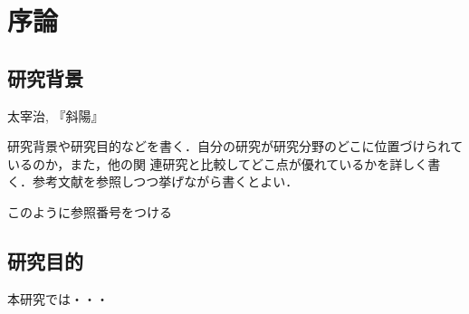 \documentclass{jsarticle}
\begin{document}
    
\chapter{序論}

\section{研究背景}


\begin{thebibliography}{9}
太宰治, 『斜陽』
\end{thebibliography}

研究背景や研究目的などを書く．自分の研究が研究分野のどこに位置づけられているのか，また，他の関
連研究と比較してどこ点が優れているかを詳しく書く．参考文献を参照しつつ挙げながら書くとよい．

このように参照番号をつける\cite{asimo}

\section{研究目的}

本研究では・・・
\end{document}

